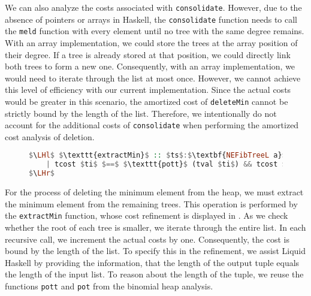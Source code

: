 \documentclass{clmthesis}
\begin{document}
We can also analyze the costs associated with \texttt{consolidate}. However, due to the absence of pointers or arrays in Haskell, the \texttt{consolidate} function needs to call the \texttt{meld} function with every element until no tree with the same degree remains. With an array implementation, we could store the trees at the array position of their degree. If a tree is already stored at that position, we could directly link both trees to form a new one. Consequently, with an array implementation, we would need to iterate through the list at most once. However, we cannot achieve this level of efficiency with our current implementation. Since the actual costs would be greater in this scenario, the amortized cost of \texttt{deleteMin} cannot be strictly bound by the length of the list. Therefore, we intentionally do not account for the additional costs of \texttt{consolidate} when performing the amortized cost analysis of deletion.

\begin{figure}[h]
\begin{lstlisting}[mathescape=true, language=haskell, caption={Cost analysis of \texttt{extractMin}.},captionpos=b, label=fig:FextractPot]
$\LHl$ $\texttt{extractMin}$ :: $ts$:$\textbf{NEFibTreeL a}$ -> {$ti$:$\textbf{Tick (FibTree a,} \textbf{[FibTree a]}$) 
	| tcost $ti$ $==$ $\texttt{pott}$ (tval $ti$) && tcost $ti$ $\leq$ length $ts$} 
$\LHr$
\end{lstlisting}
\end{figure}
For the process of deleting the minimum element from the heap, we must extract the minimum element from the remaining trees. This operation is performed by the \texttt{extractMin} function, whose cost refinement is displayed in . As we check whether the root of each tree is smaller, we iterate through the entire list. In each recursive call, we increment the actual costs by one. Consequently, the cost is bound by the length of the list. To specify this in the refinement, we assist Liquid Haskell by providing the information, that the length of the output tuple equals the length of the input list. To reason about the length of the tuple, we reuse the functions \texttt{pott} and \texttt{pot} from the binomial heap analysis.
\end{document}
